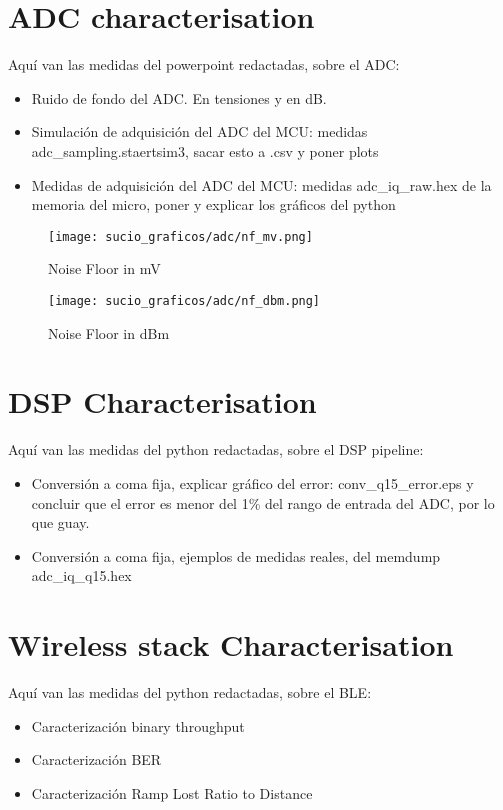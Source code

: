 \section{ADC characterisation}
Aquí van las medidas del powerpoint redactadas, sobre el ADC:
\begin{itemize}
	\item Ruido de fondo del ADC. En tensiones y en dB.
	\item Simulación de adquisición del ADC del MCU: medidas adc\_sampling.staertsim3, sacar esto a .csv y poner plots
	\item Medidas de adquisición del ADC del MCU: medidas adc\_iq\_raw.hex de la memoria del micro, poner y explicar los gráficos del python
\end{itemize}
\begin{figure}[ht]
	\centering
	\texttt{[image: sucio\_graficos/adc/nf\_mv.png]}
	\caption{Noise Floor in mV}
	\label{fig:moduloaprox50cmplancha}
\end{figure}
\begin{figure}[ht]
	\centering
	\texttt{[image: sucio\_graficos/adc/nf\_dbm.png]}
	\caption{Noise Floor in dBm}
	\label{fig:moduloaprox50cmplancha}
\end{figure}
\section{DSP Characterisation}
Aquí van las medidas del python redactadas, sobre el DSP pipeline:
\begin{itemize}
	\item Conversión a coma fija, explicar gráfico del error: conv\_q15\_error.eps y concluir que el error es menor del 1\% del rango de entrada del ADC, por lo que guay.
	\item Conversión a coma fija, ejemplos de medidas reales, del memdump adc\_iq\_q15.hex
\end{itemize}
\section{Wireless stack Characterisation}
Aquí van las medidas del python redactadas, sobre el BLE:
\begin{itemize}
	\item Caracterización binary throughput
	\item Caracterización BER
	\item Caracterización Ramp Lost Ratio to Distance
\end{itemize}


